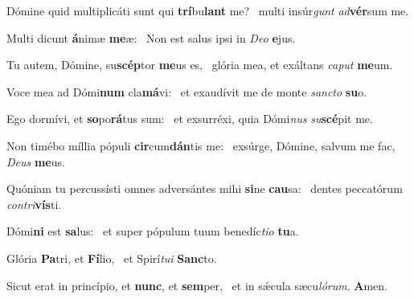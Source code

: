 \item Dómine quid multiplicáti sunt qui \textbf{trí}bu\textbf{lant} me?~\psstar{} multi insúr\textit{gunt} \textit{ad}\textbf{vér}sum me.
\item Multi dicunt \textbf{á}nimæ \textbf{me}æ:~\psstar{} Non est salus ipsi in \textit{Deo} \textbf{e}jus.
\item Tu autem, Dómine, su\textbf{scép}tor \textbf{me}us es,~\psstar{} glória mea, et exáltans \textit{caput} \textbf{me}um.
\item Voce mea ad Dómi\textbf{num} cla\textbf{má}vi:~\psstar{} et exaudívit me de monte \textit{sancto} \textbf{su}o.
\item Ego dormívi, et \textbf{so}po\textbf{rá}tus sum:~\psstar{} et exsurréxi, quia Dómi\textit{nus} \textit{su}\textbf{scé}pit me.
\item Non timébo míllia pópuli \textbf{cir}cum\textbf{dán}tis me:~\psstar{} exsúrge, Dómine, salvum me fac, \textit{Deus} \textbf{me}us.
\item Quóniam tu percussísti omnes adversántes mihi \textbf{si}ne \textbf{cau}sa:~\psstar{} dentes peccatórum \textit{contri}\textbf{vís}ti.
\item Dómi\textbf{ni} est \textbf{sa}lus:~\psstar{} et super pópulum tuum benedíc\textit{tio} \textbf{tu}a.
\item Glória \textbf{Pa}tri, et \textbf{Fí}lio,~\psstar{} et Spirí\textit{tui} \textbf{Sanc}to.
\item Sicut erat in princípio, et \textbf{nunc}, et \textbf{sem}per,~\psstar{} et in sǽcula sæcu\textit{lórum}. \textbf{A}men.
